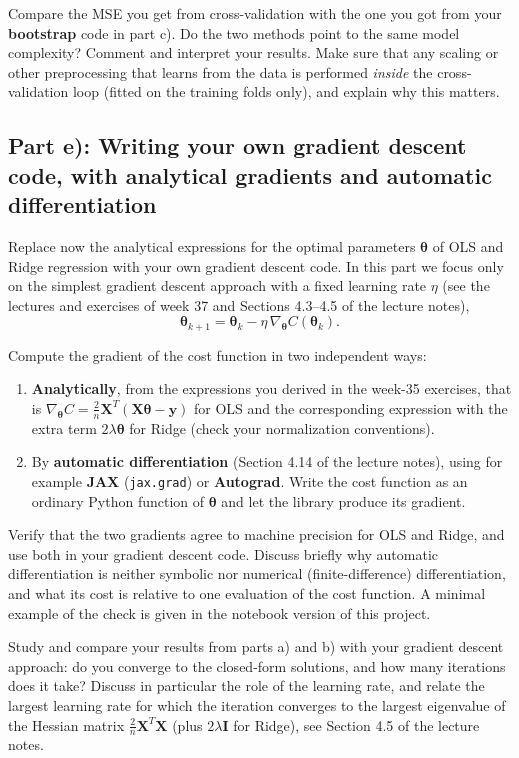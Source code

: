 \documentclass[11pt,a4paper]{article}
\begin{document}
Compare the MSE you get from cross-validation with the one you got
from your \textbf{bootstrap} code in part c).  Do the two methods point to the
same model complexity?  Comment and interpret your results.  Make sure that
any scaling or other preprocessing that learns from the data is performed
\emph{inside} the cross-validation loop (fitted on the training folds only),
and explain why this matters.

\subsection*{Part e): Writing your own gradient descent code, with analytical gradients and automatic differentiation}

Replace now the analytical expressions for the optimal parameters
$\bm{\theta}$ of OLS and Ridge regression with your own gradient descent
code.  In this part we focus only on the simplest gradient descent approach
with a fixed learning rate $\eta$ (see the lectures and exercises of week 37
and Sections 4.3--4.5 of the lecture notes),
\[
  \bm{\theta}_{k+1} = \bm{\theta}_k - \eta\,\nabla_{\bm{\theta}}C(\bm{\theta}_k).
\]

Compute the gradient of the cost function in two independent ways:
\begin{enumerate}[nosep]
  \item \textbf{Analytically}, from the expressions you derived in the week-35
        exercises, that is $\nabla_{\bm{\theta}}C = \frac{2}{n}\bm{X}^T(\bm{X}\bm{\theta}-\bm{y})$
        for OLS and the corresponding expression with the extra term
        $2\lambda\bm{\theta}$ for Ridge (check your normalization
        conventions).
  \item By \textbf{automatic differentiation} (Section 4.14 of the lecture
        notes), using for example \textbf{JAX} (\texttt{jax.grad}) or
        \textbf{Autograd}.  Write the cost function as an ordinary Python
        function of $\bm{\theta}$ and let the library produce its gradient.
\end{enumerate}
Verify that the two gradients agree to machine precision for OLS and Ridge,
and use both in your gradient descent code.  Discuss briefly why automatic
differentiation is neither symbolic nor numerical (finite-difference)
differentiation, and what its cost is relative to one evaluation of the cost
function.  A minimal example of the check is given in the notebook version of
this project.

Study and compare your results from parts a) and b) with your gradient
descent approach: do you converge to the closed-form solutions, and how many
iterations does it take?  Discuss in particular the role of the learning
rate, and relate the largest learning rate for which the iteration converges
to the largest eigenvalue of the Hessian matrix $\frac{2}{n}\bm{X}^T\bm{X}$
(plus $2\lambda\bm{I}$ for Ridge), see Section 4.5 of the lecture notes.
\end{document}

